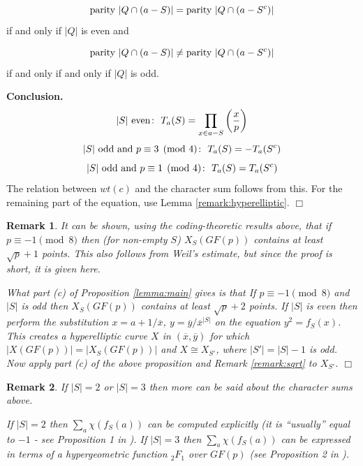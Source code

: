\documentclass[submission%
]{dmtcs}
\newtheorem{remark}{Remark}
\newtheorem{corollary}{Corollary}
\def\pf{{\bf Proof}:\ }
\def\qed{$\Box$}
\begin{document}
\[
{\rm parity}\ |Q\cap (a-S)|={\rm parity}\ |Q\cap (a-S^c)|
\]
if and only if $|Q|$ is even and 

\[
{\rm parity}\ |Q\cap (a-S)| \neq {\rm parity}\ |Q\cap (a-S^c)|
\]
if and only if and only if $|Q|$ is odd. 

{\bf Conclusion.} 
\[
|S|\ {\rm even\colon}\ T_a(S)=\prod_{x\in a-S}\left( \frac{x}{p}\right)
\]
\[
|S|\ {\rm odd\ and}\ p\equiv 3\pmod 4\colon\ T_a(S)=-T_a(S^c)
\] 
\[
|S|\ {\rm odd\ and}\ p\equiv 1\pmod 4\colon\ T_a(S)=T_a(S^c)
\]
The relation between $wt(c)$ and the character sum follows from this.
For the remaining part of the equation, use Lemma \ref{remark:hyperelliptic}.
\qed

\begin{remark}
It can be shown, using the coding-theoretic results above, that 
if $p\equiv -1 \pmod 8$ then (for non-empty $S$)
$X_{S}(GF(p))$ contains at least $\sqrt{p}+1$ points. 
This also follows from Weil's estimate, but since the proof is short, it is given 
here.


What part (c) of Proposition \ref{lemma:main} gives is that
If $p\equiv -1 \pmod 8$ and $|S|$ is odd then
$X_S(GF(p))$ contains at least $\sqrt{p}+2$ points.
If $|S|$ is even then 
perform the substitution $x = a+1/\overline{x}$, $y=\overline{y}/\overline{x}^{|S|}$
on the equation $y^2=f_S(x)$. 
This creates a hyperelliptic curve $X$ in $(\overline{x},\overline{y})$ 
for which $|X(GF(p))|=|X_S(GF(p))|$ and $X\cong X_{S'}$, where $|S'|=|S|-1$ is
odd. Now apply part (c) of the above proposition and Remark \ref{remark:sqrt}
to $X_{S'}$. \qed

\end{remark}

\begin{remark}
If $|S|=2$ or $|S|=3$ then more can be said about the character sums 
above.

If $|S|=2$ then $\sum_a \chi(f_S(a))$ can be computed explicitly 
(it is ``usually'' equal to $-1$ - see Proposition 1 in \cite{Wa}).
If $|S|=3$ then $\sum_a \chi(f_S(a))$ can be expressed in terms
of a hypergeometric function $_2F_1$ over $GF(p)$ (see Proposition 2 in 
\cite{Wa}). 

\end{remark}
\end{document}
